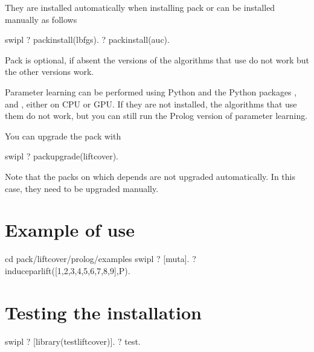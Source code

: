 \documentclass[letterpaper,10pt,english]{sphinxmanual}
\begin{document}
\sphinxAtStartPar
They are installed automatically when installing pack  or can be installed manually as follows

\begin{sphinxVerbatim}[commandchars=\\\{\}]
\PYGZdl{} swipl
?\PYGZhy{} pack\PYGZus{}install(lbfgs).
?\PYGZhy{} pack\PYGZus{}install(auc).
\end{sphinxVerbatim}

\sphinxAtStartPar
Pack  is optional, if absent the versions of the algorithms that use   do not work but the other versions work.

\sphinxAtStartPar
Parameter learning can be performed using Python and the Python packages ,  and , either on CPU or GPU.
If they are not installed, the algorithms that use them do not work, but you can still run the Prolog version of parameter learning.

\sphinxAtStartPar
You can upgrade the pack with

\begin{sphinxVerbatim}[commandchars=\\\{\}]
\PYGZdl{} swipl
?\PYGZhy{} pack\PYGZus{}upgrade(liftcover).
\end{sphinxVerbatim}

\sphinxAtStartPar
Note that the packs on which  depends are not upgraded automatically.
In this case, they need to be upgraded manually.


\section{Example of use}
\label{\detokenize{index:example-of-use}}
\begin{sphinxVerbatim}[commandchars=\\\{\}]
\PYGZdl{} cd \PYGZlt{}pack\PYGZgt{}/liftcover/prolog/examples
\PYGZdl{} swipl
?\PYGZhy{} [muta].
?\PYGZhy{} induce\PYGZus{}par\PYGZus{}lift([1,2,3,4,5,6,7,8,9],P).
\end{sphinxVerbatim}


\section{Testing the installation}
\label{\detokenize{index:testing-the-installation}}
\begin{sphinxVerbatim}[commandchars=\\\{\}]
\PYGZdl{} swipl
?\PYGZhy{} [library(test\PYGZus{}liftcover)].
?\PYGZhy{} test.
\end{sphinxVerbatim}
\end{document}
